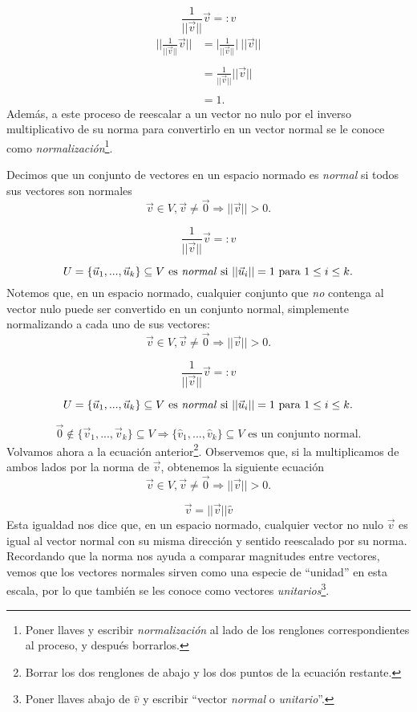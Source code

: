 \documentclass[12pt,dvipsnames]{article}
\numberwithin{equation}{section}
\begin{document}
\[
\frac{1}{||\vec{v}||} \vec{v} =: \hat{v}
\] 
\begin{align*}
                \bigg|\bigg|\frac{1}{||\vec{v}||} \vec{v} \bigg|\bigg| &= \bigg| \frac{1}{||\vec{v}||} \bigg| \ ||\vec{v}|| \\ \\
                                                                       &= \frac{1}{||\vec{v}||} ||\vec{v}|| \\ \\
                                                                       &=1.
\end{align*}
Además, a este proceso de reescalar a un vector no nulo por el inverso multiplicativo de su norma para convertirlo en un vector normal se le conoce como \emph{normalización}\footnote{Poner llaves y escribir \emph{normalización} al lado de los renglones correspondientes al proceso, y después borrarlos.}.

Decimos que un conjunto de vectores en un espacio normado es \emph{normal} si todos sus vectores son normales
\[
    \vec{v}\in V, \vec{v}\neq \vec{0} \Rightarrow ||\vec{v}||>0.
\] 

\[
    \frac{1}{||\vec{v}||} \vec{v} =: \hat{v}
\] 

\[
    U=\{\vec{u}_1,...,\vec{u}_k\}\subseteq V \ \text{es \emph{normal} si } ||\vec{u}_i|| = 1 \text{ para } 1\le i\le k.
\]
Notemos que, en un espacio normado, cualquier conjunto que \emph{no} contenga al vector nulo puede ser convertido en un conjunto normal, simplemente normalizando a cada uno de sus vectores:
\[
    \vec{v}\in V, \vec{v}\neq \vec{0} \Rightarrow ||\vec{v}||>0.
\] 

\[
    \frac{1}{||\vec{v}||} \vec{v} =: \hat{v}
\] 

\[
    U=\{\vec{u}_1,...,\vec{u}_k\}\subseteq V \ \text{es \emph{normal} si } ||\vec{u}_i|| = 1 \text{ para } 1\le i\le k.
\]

\[
\vec{0}\notin\{\vec{v}_1,...,\vec{v}_k\}\subseteq V \Rightarrow \{\hat{v}_1, ..., \hat{v}_k\}\subseteq V \text{ es un conjunto normal}.
\] 
Volvamos ahora a la ecuación anterior\footnote{Borrar los dos renglones de abajo y los dos puntos de la ecuación restante.}. Observemos que, si la multiplicamos de ambos lados por la norma de $\vec{v}$, obtenemos la siguiente ecuación
\[
    \vec{v}\in V, \vec{v}\neq \vec{0} \Rightarrow ||\vec{v}||>0.
\] 

\[
    \vec{v}= ||\vec{v}|| \hat{v}
\] 
Esta igualdad nos dice que, en un espacio normado, cualquier vector no nulo $\vec{v}$ es igual al vector normal con su misma dirección y sentido reescalado por su norma. Recordando que la norma nos ayuda a comparar magnitudes entre vectores, vemos que los vectores normales sirven como una especie de ``unidad'' en esta escala, por lo que también se les conoce como vectores \emph{unitarios}\footnote{Poner llaves abajo de $\hat{v}$ y escribir ``vector \emph{normal} o \emph{unitario}''.}. 
\end{document}

